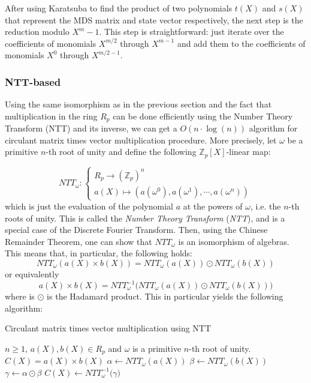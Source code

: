 \documentclass[a4paper]{article}
\begin{document}
After using Karatsuba to find the product of two polynomials $t(X)$ and $s(X)$ that represent the MDS matrix and state vector respectively, the next step is the reduction modulo $X^m-1$. This step is straightforward: just iterate over the coefficients of monomials $X^{m/2}$ through $X^{m-1}$ and add them to the coefficients of monomials $X^0$ through $X^{m/2-1}$.

\subsubsection{NTT-based}

Using the same isomorphism as in the previous section and the fact that multiplication in the ring $R_p$ can be done efficiently using the Number Theory Transform (NTT) and its inverse, we can get a $O(n \cdot\log(n))$ algorithm for circulant matrix times vector multiplication procedure. More precisely, let $\omega$ be a primitive $n$-th root of unity and define the following ${\mathbb{Z}_p[X]}$-linear map:

\begin{equation}
	NTT_{\omega} :
	\begin{cases}
		R_p \longrightarrow \left({\mathbb{Z}_p}\right)^n\\
		a(X) \mapsto \left(a(\omega^0), a(\omega^1),\cdots, a(\omega^n)\right)
	\end{cases}       
\end{equation}
which is just the evaluation of the polynomial $a$ at the powers of $\omega$, i.e. the $n$-th roots of unity. This is called the \textit{Number Theory Transform} (\textit{NTT}), and is a special case of the Discrete Fourier Transform. Then, using the Chinese Remainder Theorem, one can show that $NTT_{\omega}$ is an isomorphism of algebras. This means that, in particular, the following holds:\[NTT_{\omega}\left(a(X)\times b(X)\right) = NTT_{\omega}(a(X)) \odot  NTT_{\omega}(b(X)) \]
or equivalently \[a(X)\times b(X) = NTT_{\omega}^{-1}\big(NTT_{\omega}(a(X)) \odot  NTT_{\omega}(b(X))\big) \] 
where is $\odot$ is the Hadamard product.
This in particular yields the following algorithm:
\begin{algorithm}
	\caption{Circulant matrix times vector multiplication using NTT}\label{alg:cap}
	\begin{algorithmic}
		\Require $n \geq 1$, $a(X), b(X) \in R_p$ and $\omega$ is a primitive $n$-th root of unity.
		\Ensure $C(X) = a(X)\times b(X)$
		\State $\alpha \gets NTT_{\omega}(a(X))$
		\State $\beta \gets NTT_{\omega}(b(X))$
		\State $\gamma \gets \alpha\odot \beta$
		\State $C(X) \gets  NTT_{\omega}^{-1}\big(\gamma\big)$
	\end{algorithmic}
\end{algorithm}
\end{document}
